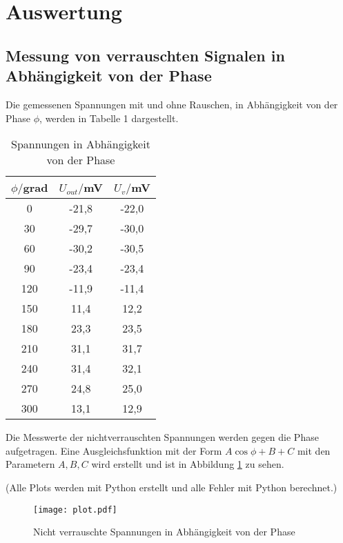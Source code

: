 \section{Auswertung}
\label{sec:Auswertung}


\subsection{Messung von verrauschten Signalen in Abhängigkeit von der Phase}

Die gemessenen Spannungen mit und ohne Rauschen, in Abhängigkeit von der Phase $\phi$, werden in Tabelle 1 dargestellt.

\begin{table}[H]
  \centering
  \caption{Spannungen in Abhängigkeit von der Phase}
  \label{tab:Phase}
  \begin{tabular}{c c c}
    \toprule
    $\phi/$grad  &  $U_{out}/$mV &  $U_v/$mV \\
    \midrule
    0     &  -21,8   &  -22,0 \\
    30    &  -29,7   &  -30,0 \\
    60    &  -30,2   &  -30,5 \\
    90    &  -23,4   &  -23,4 \\
    120   &  -11,9   &  -11,4 \\
    150   &   11,4   &   12,2 \\
    180   &   23,3   &   23,5 \\
    210   &   31,1   &   31,7 \\
    240   &   31,4   &   32,1 \\
    270   &   24,8   &   25,0 \\
    300   &   13,1   &   12,9 \\
    \bottomrule
  \end{tabular}
\end{table}

Die Messwerte der nichtverrauschten Spannungen werden gegen die Phase aufgetragen. Eine Ausgleichsfunktion mit der Form
$A \cos{\phi + B} + C$ mit den Parametern $A, B ,C$ wird erstellt und ist in Abbildung \ref{fig:plot} zu sehen.

(Alle Plots werden mit Python erstellt und alle Fehler mit Python berechnet.)



\begin{figure}[H]
  \centering
  \texttt{[image: plot.pdf]}
  \caption{Nicht verrauschte Spannungen in Abhängigkeit von der Phase}
  \label{fig:plot}
\end{figure}

